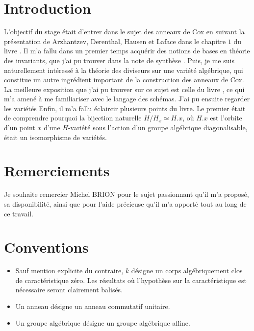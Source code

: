 
\section*{Introduction}

L'objectif du stage était d'entrer dans le sujet des anneaux de Cox en suivant la présentation de Arzhantzev, Derenthal, Hausen et Laface dans le chapitre $1$ du livre \cite{coxrings}. Il m'a fallu dans un premier temps acquérir des notions de bases en théorie des invariants, que j'ai pu trouver dans la note de synthèse \cite{LAGBrion}. Puis, je me suis naturellement intéressé à la théorie des diviseurs sur une variété algébrique, qui constitue un autre ingrédient important de la construction des anneaux de Cox. La meilleure exposition que j'ai pu trouver sur ce sujet est celle du livre \cite{Hartshorne}, ce qui m'a amené à me familiariser avec le langage des schémas. J'ai pu ensuite regarder les variétés
Enfin, il m'a fallu éclaircir plusieurs points du livre. Le premier était de comprendre pourquoi la bijection naturelle $H/H_x\simeq H.x$, où $H.x$ est l'orbite d'un point $x$ d'une $H$-variété sous l'action d'un groupe algébrique diagonalisable, était un isomorphisme de variétés.

\section*{Remerciements}

Je souhaite remercier Michel BRION pour le sujet passionnant qu'il m'a proposé, sa disponibilité, ainsi que pour l'aide précieuse qu'il m'a apporté tout au long de ce travail.

\section*{Conventions}
\label{sec:conventions}

\begin{itemize}
\item Sauf mention explicite du contraire, $k$ désigne un corps algébriquement clos de caractéristique zéro. Les résultats où l'hypothèse sur la caractéristique est nécessaire seront clairement balisés.
\item Un anneau désigne un anneau commutatif unitaire.
\item Un groupe algébrique désigne un groupe algébrique affine.
\end{itemize}



